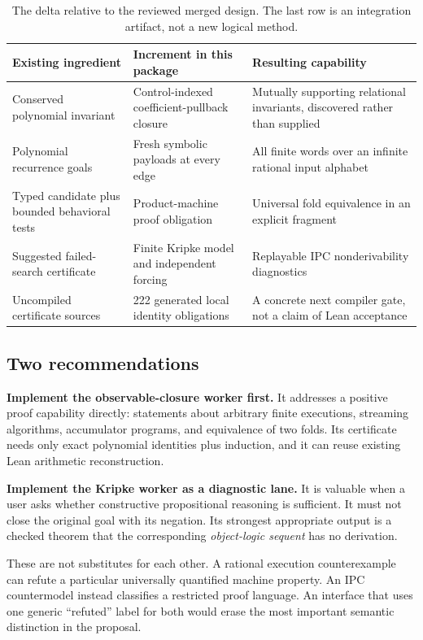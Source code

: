 \begin{table}[ht]
\centering\small
\begin{tabular}{@{}P{0.27\textwidth}P{0.30\textwidth}P{0.35\textwidth}@{}}
\toprule
Existing ingredient & Increment in this package & Resulting capability \\
\midrule
Conserved polynomial invariant & Control-indexed coefficient-pullback closure & Mutually supporting relational invariants, discovered rather than supplied \\
Polynomial recurrence goals & Fresh symbolic payloads at every edge & All finite words over an infinite rational input alphabet \\
Typed candidate plus bounded behavioral tests & Product-machine proof obligation & Universal fold equivalence in an explicit fragment \\
Suggested failed-search certificate & Finite Kripke model and independent forcing & Replayable IPC nonderivability diagnostics \\
Uncompiled certificate sources & 222 generated local identity obligations & A concrete next compiler gate, not a claim of Lean acceptance \\
\bottomrule
\end{tabular}
\caption{The delta relative to the reviewed merged design. The last row is an integration artifact, not a new logical method.}
\end{table}

\subsection{Two recommendations}
\textbf{Implement the observable-closure worker first.} It addresses a positive
proof capability directly: statements about arbitrary finite executions,
streaming algorithms, accumulator programs, and equivalence of two folds. Its
certificate needs only exact polynomial identities plus induction, and it can
reuse existing Lean arithmetic reconstruction.

\textbf{Implement the Kripke worker as a diagnostic lane.} It is valuable when a
user asks whether constructive propositional reasoning is sufficient. It must
not close the original goal with its negation. Its strongest appropriate output
is a checked theorem that the corresponding \emph{object-logic sequent} has no
derivation.

These are not substitutes for each other. A rational execution counterexample
can refute a particular universally quantified machine property. An IPC
countermodel instead classifies a restricted proof language. An interface that
uses one generic ``refuted'' label for both would erase the most important
semantic distinction in the proposal.

